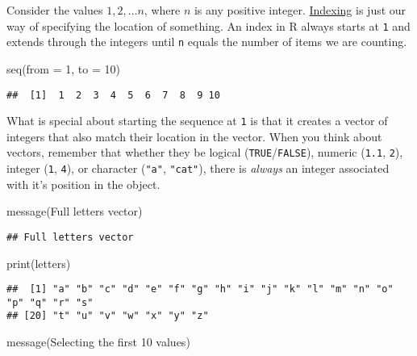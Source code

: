 \documentclass[
]{book}
\newenvironment{Shaded}{\begin{snugshade}}{\end{snugshade}}
\newcommand{\AttributeTok}[1]{\textcolor[rgb]{0.77,0.63,0.00}{#1}}
\newcommand{\DecValTok}[1]{\textcolor[rgb]{0.00,0.00,0.81}{#1}}
\newcommand{\FunctionTok}[1]{\textcolor[rgb]{0.00,0.00,0.00}{#1}}
\newcommand{\NormalTok}[1]{#1}
\newcommand{\StringTok}[1]{\textcolor[rgb]{0.31,0.60,0.02}{#1}}
\begin{document}
Consider the values \(1, 2, … n\), where \(n\) is any positive integer. \href{https://rspatial.org/intr/4-indexing.html}{Indexing} is just our way of specifying the location of something. An index in R always starts at \texttt{1} and extends through the integers until \texttt{n} equals the number of items we are counting.

\begin{Shaded}
\begin{Highlighting}[]
\FunctionTok{seq}\NormalTok{(}\AttributeTok{from =} \DecValTok{1}\NormalTok{, }\AttributeTok{to =} \DecValTok{10}\NormalTok{)}
\end{Highlighting}
\end{Shaded}

\begin{verbatim}
##  [1]  1  2  3  4  5  6  7  8  9 10
\end{verbatim}

What is special about starting the sequence at \texttt{1} is that it creates a vector of integers that also match their location in the vector. When you think about vectors, remember that whether they be logical (\texttt{TRUE}/\texttt{FALSE}), numeric (\texttt{1.1}, \texttt{2}), integer (\texttt{1}, \texttt{4}), or character (\texttt{"a"}, \texttt{"cat"}), there is \emph{always} an integer associated with it's position in the object.

\begin{Shaded}
\begin{Highlighting}[]
\FunctionTok{message}\NormalTok{(}\StringTok{\textquotesingle{}Full letters vector\textquotesingle{}}\NormalTok{)}
\end{Highlighting}
\end{Shaded}

\begin{verbatim}
## Full letters vector
\end{verbatim}

\begin{Shaded}
\begin{Highlighting}[]
\FunctionTok{print}\NormalTok{(letters)}
\end{Highlighting}
\end{Shaded}

\begin{verbatim}
##  [1] "a" "b" "c" "d" "e" "f" "g" "h" "i" "j" "k" "l" "m" "n" "o" "p" "q" "r" "s"
## [20] "t" "u" "v" "w" "x" "y" "z"
\end{verbatim}

\begin{Shaded}
\begin{Highlighting}[]
\FunctionTok{message}\NormalTok{(}\StringTok{\textquotesingle{}Selecting the first 10 values\textquotesingle{}}\NormalTok{)}
\end{Highlighting}
\end{Shaded}
\end{document}
